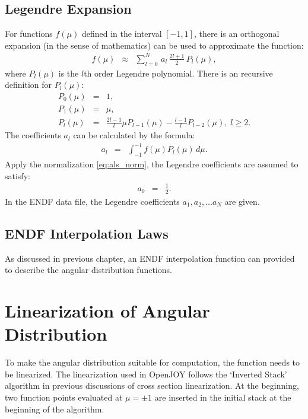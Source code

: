 \subsection{Legendre Expansion}
For functions $f(\mu)$ defined in the interval $[-1,1]$, there is an orthogonal expansion (in the sense of mathematics) can be used to approximate the function:
\begin{eqnarray}
f(\mu) &\approx& \sum_{l=0}^{N}\,a_l\,\frac{2l+1}{2}\,P_l(\mu),
\end{eqnarray}
where $P_l(\mu)$ is the $l$th order Legendre polynomial. There is an recursive definition for $P_l(\mu)$:
\begin{eqnarray}
P_0(\mu) &=& 1,\\
P_1(\mu) &=& \mu,\\
P_l(\mu) &=& \frac{2l-1}{l}\mu P_{l-1}(\mu)-\frac{l-1}{l}P_{l-2}(\mu),\;l\geq 2.
\end{eqnarray}
The coefficients $a_l$ can be calculated by the formula:
\begin{eqnarray}
a_l &=& \int_{-1}^{-1}f(\mu)P_l(\mu)\,d\mu.
\end{eqnarray}
Apply the normalization \ref{eq:als_norm}, the Legendre coefficients are assumed to satisfy:
\begin{eqnarray}
a_0 &=& \frac{1}{2}.
\end{eqnarray}
In the ENDF data file, the Legendre coefficients $a_1,a_2,\dots a_N$ are given.

\subsection{ENDF Interpolation Laws}
As discussed in previous chapter, an ENDF interpolation function can provided to describe the angular distribution functions.

\section{Linearization of Angular Distribution}
To make the angular distribution suitable for computation, the function needs to be linearized. The linearization used in OpenJOY follows the `Inverted Stack' algorithm in previous discussions of cross section linearization. At the beginning, two function points evaluated at $\mu=\pm1$ are inserted in the initial stack at the beginning of the algorithm.
